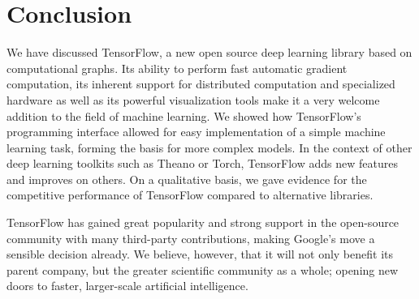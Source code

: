 \section{Conclusion}\label{sec:conclusion}

We have discussed TensorFlow, a new open source deep learning library based on
computational graphs. Its ability to perform fast automatic gradient
computation, its inherent support for distributed computation and specialized
hardware as well as its powerful visualization tools make it a very welcome
addition to the field of machine learning. We showed how TensorFlow's
programming interface allowed for easy implementation of a simple machine
learning task, forming the basis for more complex models. In the context of
other deep learning toolkits such as Theano or Torch, TensorFlow adds new
features and improves on others. On a qualitative basis, we gave evidence for
the competitive performance of TensorFlow compared to alternative libraries.

TensorFlow has gained great popularity and strong support in the open-source
community with many third-party contributions, making Google's move a sensible
decision already. We believe, however, that it will not only benefit its parent
company, but the greater scientific community as a whole; opening new doors to
faster, larger-scale artificial intelligence.

